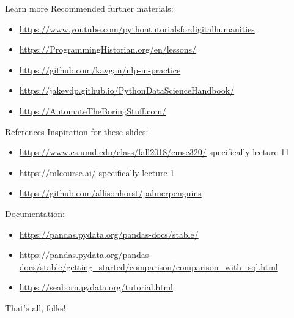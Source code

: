 \documentclass[aspectratio=169,usenames,dvipsnames]{beamer}
\begin{document}
%



\begin{frame}{Learn more}
    Recommended further materials:
    \vspace{1em}
    \begin{itemize}
        \item \url{https://www.youtube.com/pythontutorialsfordigitalhumanities}
        \item \url{https://ProgrammingHistorian.org/en/lessons/}
        \item \url{https://github.com/kavgan/nlp-in-practice}
        \item \url{https://jakevdp.github.io/PythonDataScienceHandbook/}
        \item \url{https://AutomateTheBoringStuff.com/}
    \end{itemize}
\end{frame}


\begin{frame}{References}
Inspiration for these slides:
\begin{itemize}
\item \url{https://www.cs.umd.edu/class/fall2018/cmsc320/}
    specifically lecture 11
\item \url{https://mlcourse.ai/}
    specifically lecture 1
\item \url{https://github.com/allisonhorst/palmerpenguins}
\end{itemize}

\vspace{1em}
Documentation:
\begin{itemize}
    \item \url{https://pandas.pydata.org/pandas-docs/stable/}
    \item \url{https://pandas.pydata.org/pandas-docs/stable/getting_started/comparison/comparison_with_sql.html}
    \item \url{https://seaborn.pydata.org/tutorial.html}
\end{itemize}
\end{frame}


\begin{frame}\Huge\centering
    That's all, folks!
\end{frame}
\end{document}
